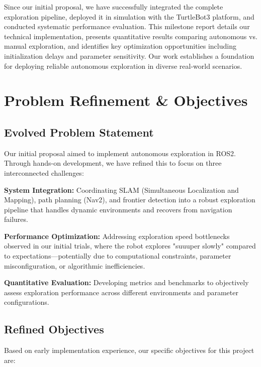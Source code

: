 \documentclass[conference]{IEEEtran}
\begin{document}
Since our initial proposal, we have successfully integrated the complete exploration pipeline, deployed it in simulation with the TurtleBot3 platform, and conducted systematic performance evaluation. This milestone report details our technical implementation, presents quantitative results comparing autonomous vs. manual exploration, and identifies key optimization opportunities including initialization delays and parameter sensitivity. Our work establishes a foundation for deploying reliable autonomous exploration in diverse real-world scenarios.

\section{Problem Refinement \& Objectives}

\subsection{Evolved Problem Statement}

Our initial proposal aimed to implement autonomous exploration in ROS2. Through hands-on development, we have refined this to focus on three interconnected challenges:

\textbf{System Integration:} Coordinating SLAM (Simultaneous Localization and Mapping), path planning (Nav2), and frontier detection into a robust exploration pipeline that handles dynamic environments and recovers from navigation failures.

\textbf{Performance Optimization:} Addressing exploration speed bottlenecks observed in our initial trials, where the robot explores "suuuper slowly" compared to expectations—potentially due to computational constraints, parameter misconfiguration, or algorithmic inefficiencies.

\textbf{Quantitative Evaluation:} Developing metrics and benchmarks to objectively assess exploration performance across different environments and parameter configurations.

\subsection{Refined Objectives}

Based on early implementation experience, our specific objectives for this project are:
\end{document}
